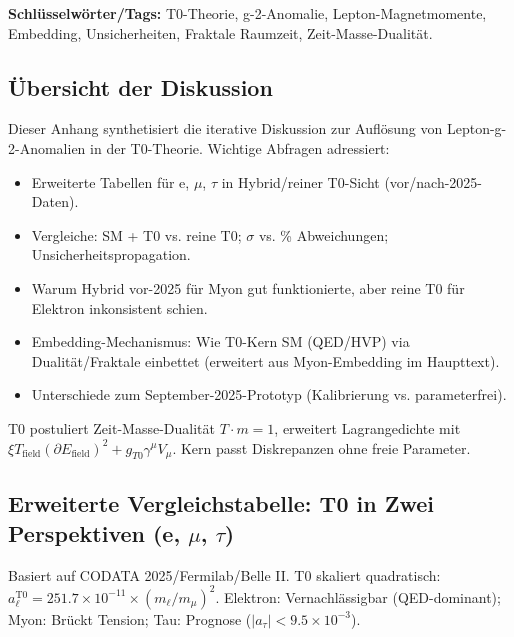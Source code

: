 \documentclass[12pt,a4paper]{article}
\begin{document}
	\textbf{Schlüsselwörter/Tags:} T0-Theorie, g-2-Anomalie, Lepton-Magnetmomente, Embedding, Unsicherheiten, Fraktale Raumzeit, Zeit-Masse-Dualität.
	
	\subsection{Übersicht der Diskussion}
	
	Dieser Anhang synthetisiert die iterative Diskussion zur Auflösung von Lepton-g-2-Anomalien in der T0-Theorie. Wichtige Abfragen adressiert:
	\begin{itemize}
		\item Erweiterte Tabellen für e, $\mu$, $\tau$ in Hybrid/reiner T0-Sicht (vor/nach-2025-Daten).
		\item Vergleiche: SM + T0 vs. reine T0; $\sigma$ vs. \% Abweichungen; Unsicherheitspropagation.
		\item Warum Hybrid vor-2025 für Myon gut funktionierte, aber reine T0 für Elektron inkonsistent schien.
		\item Embedding-Mechanismus: Wie T0-Kern SM (QED/HVP) via Dualität/Fraktale einbettet (erweitert aus Myon-Embedding im Haupttext).
		\item Unterschiede zum September-2025-Prototyp (Kalibrierung vs. parameterfrei).
	\end{itemize}
	
	T0 postuliert Zeit-Masse-Dualität $T \cdot m = 1$, erweitert Lagrangedichte mit $\xi T_\text{field} (\partial E_\text{field})^2 + g_{T0} \gamma^\mu V_\mu$. Kern passt Diskrepanzen ohne freie Parameter.
	
	\subsection{Erweiterte Vergleichstabelle: T0 in Zwei Perspektiven (e, $\mu$, $\tau$)}
	
	Basiert auf CODATA 2025/Fermilab/Belle II. T0 skaliert quadratisch: $a_\ell^\text{T0} = 251.7 \times 10^{-11} \times (m_\ell / m_\mu)^2$. Elektron: Vernachlässigbar (QED-dominant); Myon: Brückt Tension; Tau: Prognose ($|a_\tau| < 9.5 \times 10^{-3}$).
	
\end{document}
